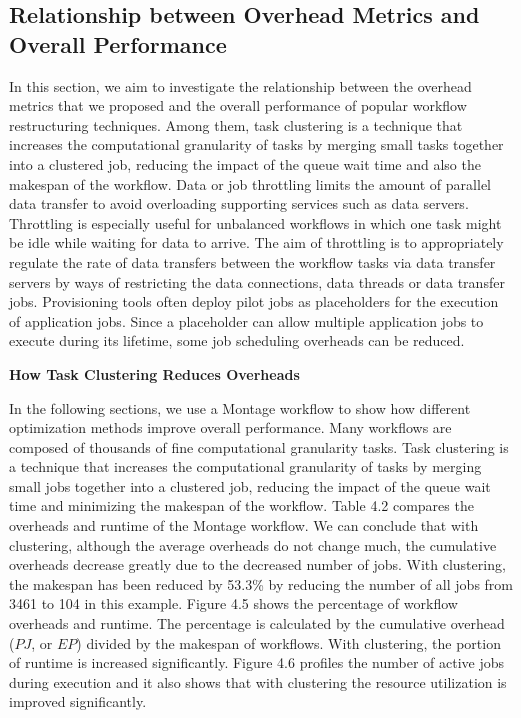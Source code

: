 \documentclass[final,5p,times,twocolumn]{elsarticle}
\begin{document}
\subsection{Relationship between Overhead Metrics and Overall Performance}

In this section, we aim to investigate the relationship between the overhead metrics that we proposed and the overall performance of popular workflow restructuring techniques. Among them, task clustering \cite{Singh2008} is a technique that increases the computational granularity of tasks by merging small tasks together into a clustered job, reducing the impact of the queue wait time and also the makespan of the workflow. Data or job throttling \cite{Humphrey2008} limits the amount of parallel data transfer to avoid overloading supporting services such as data servers. Throttling is especially useful for unbalanced workflows in which one task might be idle while waiting for data to arrive. The aim of throttling is to appropriately regulate the rate of data transfers between the workflow tasks via data transfer servers by ways of restricting the data connections, data threads or data transfer jobs. Provisioning tools often deploy pilot jobs as placeholders for the execution of application jobs. Since a placeholder can allow multiple application jobs to execute during its lifetime, some job scheduling overheads can be reduced. 

\textbf{How Task Clustering Reduces Overheads}

In the following sections, we use a Montage workflow to show how different optimization methods improve overall performance. Many workflows are composed of thousands of fine computational granularity tasks. Task clustering is a technique that increases the computational granularity of tasks by merging small jobs together into a clustered job, reducing the impact of the queue wait time and minimizing the makespan of the workflow. Table 4.2 compares the overheads and runtime of the Montage workflow. We can conclude that with clustering, although the average overheads do not change much, the cumulative overheads decrease greatly due to the decreased number of jobs. With clustering, the makespan has been reduced by 53.3\% by reducing the number of all jobs from 3461 to 104 in this example. Figure 4.5 shows the percentage of workflow overheads and runtime. The percentage is calculated by the cumulative overhead ($PJ$, or $EP$) divided by the makespan of workflows. With clustering, the portion of runtime is increased significantly. Figure 4.6 profiles the number of active jobs during execution and it also shows that with clustering the resource utilization is improved significantly. 
\end{document}
